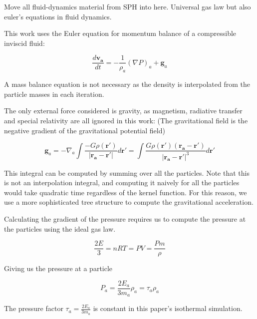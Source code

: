 \documentclass[../main.tex]{subfiles}
\begin{document}
Move all fluid-dynamics material from SPH into here. Universal gas law but also euler's
equations in fluid dynamics.

This work uses the Euler equation for momentum balance of a compressible inviscid fluid:

\begin{equation}
    \frac{d\bm{v_a}}{dt}
    = - \frac{1}{\rho_a} (\nabla P)_a + \bm{g}_a
\end{equation}

A mass balance equation is not necessary as the density is interpolated from the particle masses in
each iteration.

The only external force considered is gravity, as magnetism, radiative transfer and special
relativity are all ignored in this work: (The gravitational field is the negative gradient of the
gravitational potential field)

\begin{equation}
    \bm{g}_a
    = -\nabla_a\int\frac{-G\rho(\bm{r'})}{|\bm{r_a} - \bm{r'}|} d\bm{r'}
    = \int\frac{G\rho(\bm{r'})(\bm{r_a}-\bm{r'})}{|\bm{r_a}-\bm{r'}|^3} d\bm{r'}
\end{equation}

This integral can be computed by summing over all the particles. Note that this is not an
interpolation integral, and computing it naively for all the particles would take quadratic time
regardless of the kernel function. For this reason, we use a more sophisticated tree structure to
compute the gravitational acceleration.

Calculating the gradient of the pressure requires us to compute the pressure at the particles using
the ideal gas law.

\begin{equation}
    \frac{2E}{3} = nRT = PV = \frac{Pm}{\rho}
\end{equation}

Giving us the pressure at a particle

\begin{equation}
    P_a = \frac{2 E_a}{3 m_a} \rho_a = \tau_a \rho_a
\end{equation}

The pressure factor $\tau_a = \frac{2E_a}{3m_a}$ is constant in this paper's
isothermal simulation.
\end{document}
